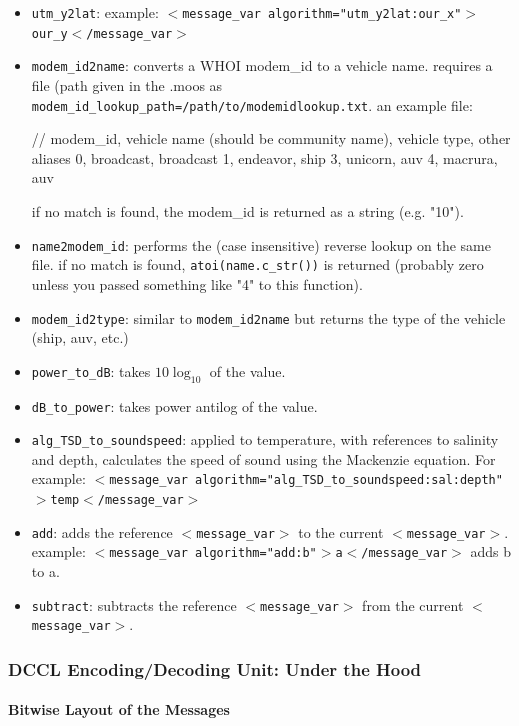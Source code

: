 \documentclass[11pt, letterpaper, oneside]{memoir}
\newcommand{\xmltag}[1]{\texttt{$<$#1$>$}}
\begin{document}
\begin{itemize}
\begin{itemize}
\item \verb|utm_y2lat|: example: \xmltag{message\_var algorithm="utm\_y2lat:our\_x"$>$our\_y$<$/message\_var}
\item \verb|modem_id2name|: converts a WHOI modem\_id to a vehicle name. requires a file (path given in the .moos as \verb|modem_id_lookup_path=/path/to/modemidlookup.txt|. an example file:
\begin{boxedverbatim}
// modem_id, vehicle name (should be community name), vehicle type, other aliases
0, broadcast, broadcast
1, endeavor, ship
3, unicorn, auv
4, macrura, auv
\end{boxedverbatim}
\resetbvlinenumber
if no match is found, the modem\_id is returned as a string (e.g. "10").
\item \verb|name2modem_id|: performs the (case insensitive) reverse lookup on the same file. if no match is found, \verb|atoi(name.c_str())| is returned (probably zero unless you passed something like "4" to this function).
\item \verb|modem_id2type|: similar to \verb|modem_id2name| but returns the type of the vehicle (ship, auv, etc.)
\item \verb|power_to_dB|: takes $10\log_{10}$ of the value.
\item \verb|dB_to_power|: takes power antilog of the value.
\item \verb|alg_TSD_to_soundspeed|: applied to temperature, with references to salinity and depth, calculates the speed of sound using the Mackenzie equation. For example: \xmltag{message\_var algorithm="alg\_TSD\_to\_soundspeed:sal:depth"$>$temp$<$/message\_var}
\item \verb|add|: adds the reference \xmltag{message\_var} to the current \xmltag{message\_var}. example: \xmltag{message\_var algorithm="add:b"$>$a$<$/message\_var} adds b to a.
\item \verb|subtract|: subtracts the reference \xmltag{message\_var} from the current \xmltag{message\_var}.
\end{itemize}

\subsubsection{DCCL Encoding/Decoding Unit: Under the Hood}

\paragraph{Bitwise Layout of the Messages}


\end{itemize}
\end{document}
